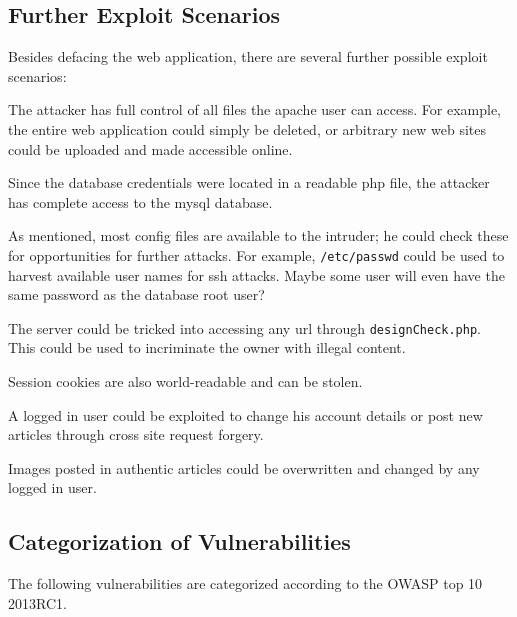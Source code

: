 \documentclass[a4paper,10pt]{article}
\begin{document}
\subsection{Further Exploit Scenarios}

Besides defacing the web application, there are several further possible exploit scenarios:

The attacker has full control of all files the apache user can access. For example,
the entire web application could simply be deleted, or arbitrary new web sites could
be uploaded and made accessible online.

Since the database credentials were located in a readable php file, the attacker
has complete access to the mysql database.

As mentioned, most config files are available to the intruder; he could check these
for opportunities for further attacks. For example, \verb|/etc/passwd| could
be used to harvest available user names for ssh attacks. Maybe some user will
even have the same password as the database root user?

The server could be tricked into accessing any url through \verb|designCheck.php|.
This could be used to incriminate the owner with illegal content.

Session cookies are also world-readable and can be stolen.

A logged in user could be exploited to change his account details or post new articles through
cross site request forgery.

Images posted in authentic articles could be overwritten and changed by any logged in user.

\subsection{Categorization of Vulnerabilities}

The following vulnerabilities are categorized according to the OWASP top 10 2013RC1.
\end{document}
